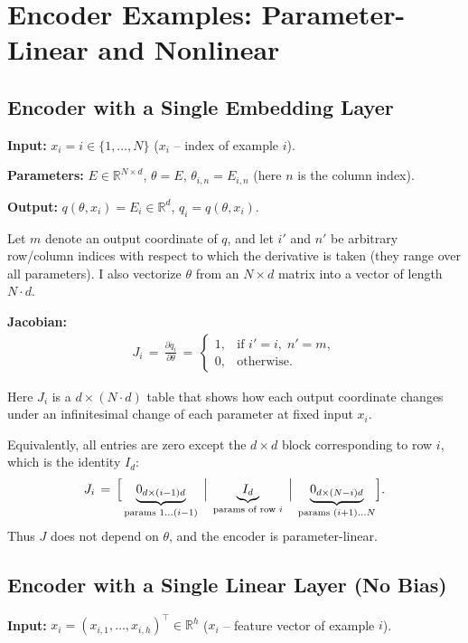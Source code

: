 \section{Encoder Examples: Parameter-Linear and Nonlinear}\label{app:encoders}

\subsection{Encoder with a Single Embedding Layer}\label{app:embed}
\textbf{Input:} $x_i = i \in \{1,\dots,N\}$ \;($x_i$ -- index of example $i$).

\textbf{Parameters:} $E\in\mathbb{R}^{N\times d}$, \;$\theta=E$, \;$\theta_{i,n}=E_{i,n}$ \;(here $n$ is the column index).

\textbf{Output:} $q(\theta,x_i)=E_i\in\mathbb{R}^{d}$, \;$q_i = q(\theta,x_i)$.

Let $m$ denote an output coordinate of $q$, and let $i'$ and $n'$ be arbitrary row/column indices with respect to which the derivative is taken (they range over all parameters). I also vectorize $\theta$ from an $N\times d$ matrix into a vector of length $N\!\cdot\! d$.

\textbf{Jacobian:}
\begin{align}
J_i \,=\, \frac{\partial q_i}{\partial \theta} \,=\, \begin{cases}
1, & \text{if } i' = i,\; n' = m,\\
0, & \text{otherwise.}
\end{cases}
\end{align}

Here $J_i$ is a $d \times (N\!\cdot\! d)$ table that shows how each output coordinate changes under an infinitesimal change of each parameter at fixed input $x_i$.

Equivalently, all entries are zero except the $d\times d$ block corresponding to row $i$, which is the identity $I_d$:
\begin{align}
J_i \,=\, \Bigl[\, \underbrace{0_{d\times (i-1)d}}_{\text{params }1\ldots(i-1)} \;\Big|\; \underbrace{I_d}_{\text{params of row }i} \;\Big|\; \underbrace{0_{d\times (N-i)d}}_{\text{params }(i+1)\ldots N} \Bigr].
\end{align}
Thus $J$ does not depend on $\theta$, and the encoder is parameter-linear.

\subsection{Encoder with a Single Linear Layer (No Bias)}\label{app:linear}
\textbf{Input:} $x_i = (x_{i,1},\dots,x_{i,h})^{\!\top} \in \mathbb{R}^{h}$ \;($x_i$ -- feature vector of example $i$).

